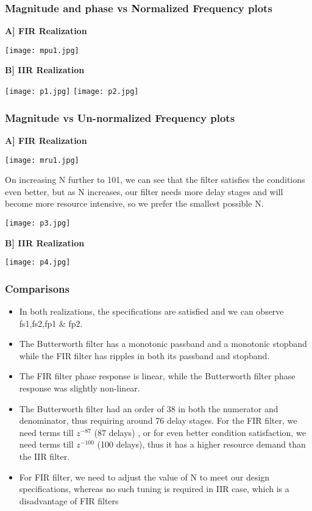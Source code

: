\documentclass[12pt]{article}
\begin{document}
\subsubsection{Magnitude and phase vs Normalized Frequency plots}
\textbf{A] FIR Realization}
\begin{center}
    \texttt{[image: mpu1.jpg]}
\end{center}
\textbf{B] IIR Realization}
\begin{center}
    \texttt{[image: p1.jpg]}
    \texttt{[image: p2.jpg]}
\end{center}
\subsubsection{Magnitude vs Un-normalized Frequency plots}
\textbf{A] FIR Realization}
\begin{center}
    \texttt{[image: mru1.jpg]}
\end{center}
On increasing N further to 101, we can see that the filter satisfies the conditions even better, but as N increases, our filter needs more delay stages and will become more resource intensive, so we prefer the smallest possible N.
\begin{center}
    \texttt{[image: p3.jpg]}
\end{center}
\textbf{B] IIR Realization}
\begin{center}
    \texttt{[image: p4.jpg]}
\end{center}
\subsubsection{Comparisons}
\begin{itemize}
    \item In both realizations, the specifications are satisfied and we can observe fs1,fs2,fp1 \& fp2.
    \item The Butterworth filter has a monotonic passband and a monotonic stopband while the FIR filter has ripples in both its passband and stopband.
    \item The FIR filter phase response is linear, while the Butterworth filter phase response was slightly non-linear.
    \item The Butterworth filter had an order of 38 in both the numerator and denominator, thus requiring around 76 delay stages. For the FIR filter, we need terms till $z^{-87}$ (87 delays) , or for even better condition satisfaction, we need terms till $z^{-100}$ (100 delays), thus it has a higher resource demand than the IIR filter.
    \item For FIR filter, we need to adjust the value of N to meet our design specifications, whereas no such
tuning is required in IIR case, which is a disadvantage of FIR filters
\end{itemize}
\end{document}
